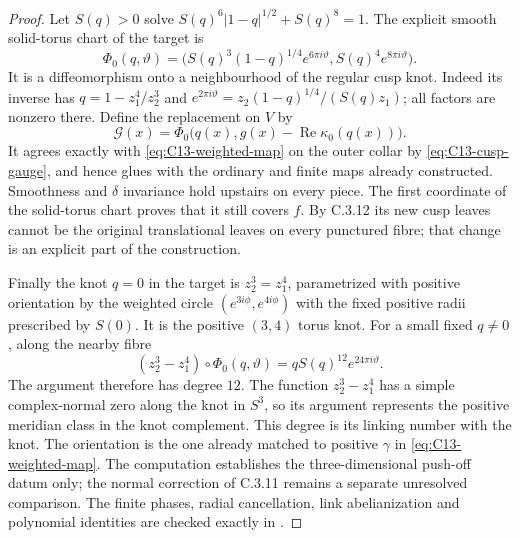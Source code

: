 \begin{proof}
Let $S(q)>0$ solve
$S(q)^6|1-q|^{1/2}+S(q)^8=1$. The explicit smooth solid-torus
chart of the target is
\[
 \Phi_0(q,\vartheta)=
 \bigl(S(q)^3(1-q)^{1/4}e^{6\pi i\vartheta},
                         S(q)^4e^{8\pi i\vartheta}\bigr).
\]
It is a diffeomorphism onto a neighbourhood of the regular
cusp knot. Indeed its inverse has
$q=1-z_1^4/z_2^3$ and
$e^{2\pi i\vartheta}=z_2(1-q)^{1/4}/(S(q)z_1)$;
all factors are nonzero there. Define the replacement on $V$
by
\[
 \mathcal G(x)=
 \Phi_0\bigl(q(x),g(x)-\operatorname{Re}\kappa_0(q(x))\bigr).
\]
It agrees exactly with \eqref{eq:C13-weighted-map} on the outer
collar by \eqref{eq:C13-cusp-gauge}, and hence glues with the
ordinary and finite maps already constructed. Smoothness and
$\delta$ invariance hold upstairs on every piece. The first
coordinate of the solid-torus chart proves that it still covers
$f$. By C.3.12 its new cusp leaves cannot be the original
translational leaves on every punctured fibre; that change is
an explicit part of the construction.

Finally the knot $q=0$ in the target is
$z_2^3=z_1^4$, parametrized with positive orientation by the
weighted circle $(e^{3i\phi},e^{4i\phi})$ with the fixed positive
radii prescribed by $S(0)$. It is the positive $(3,4)$ torus
knot. For a small fixed $q\ne0$, along the nearby fibre
\[
 (z_2^3-z_1^4)\circ\Phi_0(q,\vartheta)
                  =q S(q)^{12}e^{24\pi i\vartheta}.
\]
The argument therefore has degree $12$. The function
$z_2^3-z_1^4$ has a simple complex-normal zero along the
knot in $S^3$, so its argument represents the positive
meridian class in the knot complement. This degree is its
linking number with the knot. The orientation is the one
already matched to positive $\gamma$ in
\eqref{eq:C13-weighted-map}. The computation establishes the
three-dimensional push-off datum only; the normal correction
of C.3.11 remains a separate unresolved comparison.
The finite phases, radial cancellation, link abelianization and
polynomial identities are checked exactly in
.
\end{proof}
